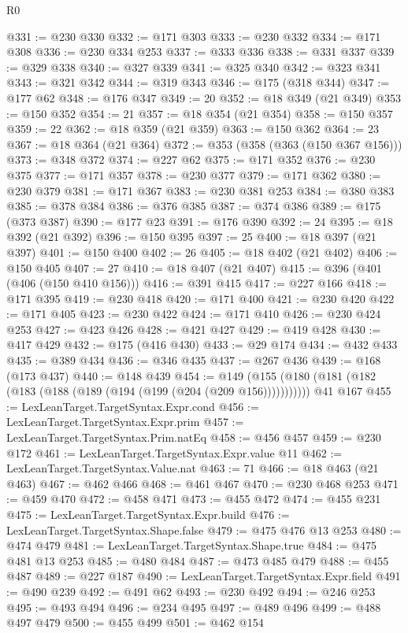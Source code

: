 \begin{lexlean}{R0}
\begin{coremodule}
@331 := @230 @330
@332 := @171 @303
@333 := @230 @332
@334 := @171 @308
@336 := @230 @334 @253
@337 := @333 @336
@338 := @331 @337
@339 := @329 @338
@340 := @327 @339
@341 := @325 @340
@342 := @323 @341
@343 := @321 @342
@344 := @319 @343
@346 := @175 (@318 @344)
@347 := @177 @62
@348 := @176 @347
@349 := 20
@352 := @18 @349 (@21 @349)
@353 := @150 @352
@354 := 21
@357 := @18 @354 (@21 @354)
@358 := @150 @357
@359 := 22
@362 := @18 @359 (@21 @359)
@363 := @150 @362
@364 := 23
@367 := @18 @364 (@21 @364)
@372 := @353 (@358 (@363 (@150 @367 @156)))
@373 := @348 @372
@374 := @227 @62
@375 := @171 @352
@376 := @230 @375
@377 := @171 @357
@378 := @230 @377
@379 := @171 @362
@380 := @230 @379
@381 := @171 @367
@383 := @230 @381 @253
@384 := @380 @383
@385 := @378 @384
@386 := @376 @385
@387 := @374 @386
@389 := @175 (@373 @387)
@390 := @177 @23
@391 := @176 @390
@392 := 24
@395 := @18 @392 (@21 @392)
@396 := @150 @395
@397 := 25
@400 := @18 @397 (@21 @397)
@401 := @150 @400
@402 := 26
@405 := @18 @402 (@21 @402)
@406 := @150 @405
@407 := 27
@410 := @18 @407 (@21 @407)
@415 := @396 (@401 (@406 (@150 @410 @156)))
@416 := @391 @415
@417 := @227 @166
@418 := @171 @395
@419 := @230 @418
@420 := @171 @400
@421 := @230 @420
@422 := @171 @405
@423 := @230 @422
@424 := @171 @410
@426 := @230 @424 @253
@427 := @423 @426
@428 := @421 @427
@429 := @419 @428
@430 := @417 @429
@432 := @175 (@416 @430)
@433 := @29 @174
@434 := @432 @433
@435 := @389 @434
@436 := @346 @435
@437 := @267 @436
@439 := @168 (@173 @437)
@440 := @148 @439
@454 := @149
    (@155 (@180 (@181 (@182 (@183 (@188 (@189 (@194 (@199 (@204 (@209 @156)))))))))))
    @41
    @167
@455 := LexLeanTarget.TargetSyntax.Expr.cond
@456 := LexLeanTarget.TargetSyntax.Expr.prim
@457 := LexLeanTarget.TargetSyntax.Prim.natEq
@458 := @456 @457
@459 := @230 @172
@461 := LexLeanTarget.TargetSyntax.Expr.value @11
@462 := LexLeanTarget.TargetSyntax.Value.nat
@463 := 71
@466 := @18 @463 (@21 @463)
@467 := @462 @466
@468 := @461 @467
@470 := @230 @468 @253
@471 := @459 @470
@472 := @458 @471
@473 := @455 @472
@474 := @455 @231
@475 := LexLeanTarget.TargetSyntax.Expr.build
@476 := LexLeanTarget.TargetSyntax.Shape.false
@479 := @475 @476 @13 @253
@480 := @474 @479
@481 := LexLeanTarget.TargetSyntax.Shape.true
@484 := @475 @481 @13 @253
@485 := @480 @484
@487 := @473 @485 @479
@488 := @455 @487
@489 := @227 @187
@490 := LexLeanTarget.TargetSyntax.Expr.field
@491 := @490 @239
@492 := @491 @62
@493 := @230 @492
@494 := @246 @253
@495 := @493 @494
@496 := @234 @495
@497 := @489 @496
@499 := @488 @497 @479
@500 := @455 @499
@501 := @462 @154

\end{coremodule}
\end{lexlean}
